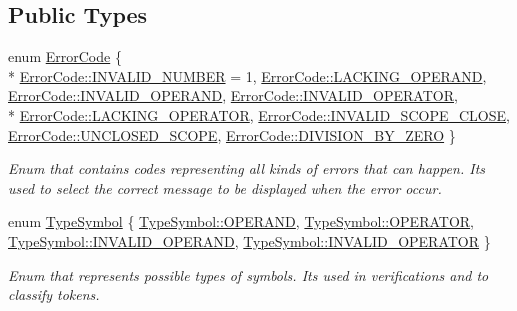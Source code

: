 \subsection*{Public Types}
\begin{DoxyCompactItemize}
\item 
enum \hyperlink{classBares_ad484a97e0efc1721d2b95209a1700e44}{Error\+Code} \{ \\*
\hyperlink{classBares_ad484a97e0efc1721d2b95209a1700e44a077915ac2c681ed3c2e5143fa6855abc}{Error\+Code\+::\+I\+N\+V\+A\+L\+I\+D\+\_\+\+N\+U\+M\+B\+ER} = 1, 
\hyperlink{classBares_ad484a97e0efc1721d2b95209a1700e44ae8480abe361722c6fc560d57a8751712}{Error\+Code\+::\+L\+A\+C\+K\+I\+N\+G\+\_\+\+O\+P\+E\+R\+A\+ND}, 
\hyperlink{classBares_ad484a97e0efc1721d2b95209a1700e44a6bf179afa8f7fba18cf39bc0ca6fe043}{Error\+Code\+::\+I\+N\+V\+A\+L\+I\+D\+\_\+\+O\+P\+E\+R\+A\+ND}, 
\hyperlink{classBares_ad484a97e0efc1721d2b95209a1700e44a29b8e189abb3870e81dcf17ffcbf1f31}{Error\+Code\+::\+I\+N\+V\+A\+L\+I\+D\+\_\+\+O\+P\+E\+R\+A\+T\+OR}, 
\\*
\hyperlink{classBares_ad484a97e0efc1721d2b95209a1700e44a22bca2cdebe774eae0632624429e990d}{Error\+Code\+::\+L\+A\+C\+K\+I\+N\+G\+\_\+\+O\+P\+E\+R\+A\+T\+OR}, 
\hyperlink{classBares_ad484a97e0efc1721d2b95209a1700e44a9f3ccb0df8d33fb668e9473f6bd04a35}{Error\+Code\+::\+I\+N\+V\+A\+L\+I\+D\+\_\+\+S\+C\+O\+P\+E\+\_\+\+C\+L\+O\+SE}, 
\hyperlink{classBares_ad484a97e0efc1721d2b95209a1700e44ae664084bba857b2c43cb86f844efdb04}{Error\+Code\+::\+U\+N\+C\+L\+O\+S\+E\+D\+\_\+\+S\+C\+O\+PE}, 
\hyperlink{classBares_ad484a97e0efc1721d2b95209a1700e44a5e807fe8929e4974ec886390b3832033}{Error\+Code\+::\+D\+I\+V\+I\+S\+I\+O\+N\+\_\+\+B\+Y\+\_\+\+Z\+E\+RO}
 \}\begin{DoxyCompactList}\small\item\em Enum that contains codes representing all kinds of errors that can happen. It\textquotesingle{}s used to select the correct message to be displayed when the error occur. \end{DoxyCompactList}
\item 
enum \hyperlink{classBares_a656cd507b0ddaa049dc7e6548459b6d8}{Type\+Symbol} \{ \hyperlink{classBares_a656cd507b0ddaa049dc7e6548459b6d8a11f3de9b2b548c31805cf34d512ee177}{Type\+Symbol\+::\+O\+P\+E\+R\+A\+ND}, 
\hyperlink{classBares_a656cd507b0ddaa049dc7e6548459b6d8a986496ca5b23669b8661171566a167c3}{Type\+Symbol\+::\+O\+P\+E\+R\+A\+T\+OR}, 
\hyperlink{classBares_a656cd507b0ddaa049dc7e6548459b6d8a6bf179afa8f7fba18cf39bc0ca6fe043}{Type\+Symbol\+::\+I\+N\+V\+A\+L\+I\+D\+\_\+\+O\+P\+E\+R\+A\+ND}, 
\hyperlink{classBares_a656cd507b0ddaa049dc7e6548459b6d8a29b8e189abb3870e81dcf17ffcbf1f31}{Type\+Symbol\+::\+I\+N\+V\+A\+L\+I\+D\+\_\+\+O\+P\+E\+R\+A\+T\+OR}
 \}\begin{DoxyCompactList}\small\item\em Enum that represents possible types of symbols. It\textquotesingle{}s used in verifications and to classify tokens. \end{DoxyCompactList}
\end{DoxyCompactItemize}
